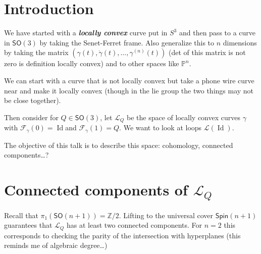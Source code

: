\section{Introduction}


We have started with a \textit{\textbf{locally convex}} curve put in $S^3$ and then pass to a curve in $\mathsf{SO}(3)$ by taking the Senet-Ferret frame. Also generalize this to $n$ dimensions by taking the matrix  $(\gamma(t),\dot\gamma(t),\ldots, \gamma^{(n)}(t))$ (det of this matrix is not zero is definition locally convex) and to other spaces like $\mathbb{P}^n$.

We can start with a curve that is not locally convex but take a phone wire curve near and make it locally convex (though in the lie group the two things may not be close together).

Then consider for $Q \in \mathsf{SO}(3)$, let $\mathcal{L}_{Q}$ be the space of locally convex curves $\gamma$ with $\mathcal{F}_\gamma(0)=\operatorname{Id}$and $\mathcal{F}_\gamma(1)=Q$. We want to look at loops $ \mathcal{L}(\operatorname{Id})$.

The objective of this talk is to describe this space: cohomology, connected components…?

\section{Connected components of $\mathcal{L}_Q$}

Recall that $\pi_{1}(\mathsf{SO}(n+1))=\mathbb{Z}/2$. Lifting to the universal cover $\mathsf{Spin}(n+1)$ guarantees that $\mathcal{L}_Q$ has at least two connected components. For $n=2$ this corresponds to checking the parity of the intersection with hyperplanes ({\color{3}this reminds me of algebraic degree…})



